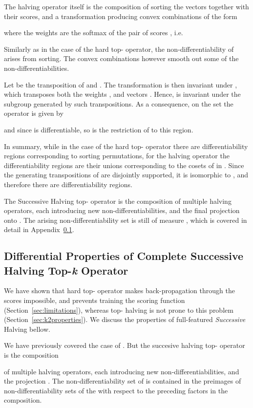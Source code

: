 \documentclass{article}
\begin{document}
The halving operator itself is the composition of sorting the vectors together with their scores, and a transformation  producing  convex combinations of the form 

where the weights are the softmax of the pair of scores , i.e.


Similarly as in the case of the hard top- operator, the non-differentiability of  arises from sorting. The convex combinations however smooth out some of the non-differentiabilities.

Let  be the transposition of  and . The transformation  is then invariant under , which transposes both the weights , and vectors . Hence,  is invariant under the subgroup  generated by such transpositions. As a consequence, on the set  the operator  is given by

and since  is differentiable, so is the restriction of  to this region.

In summary, while in the case of the hard top- operator there are  differentiability regions corresponding to sorting permutations, for the halving operator the differentiability regions are their unions corresponding to the cosets of  in . Since the generating transpositions of  are disjointly supported, it is isomorphic to , and therefore there are  differentiability regions.

The Successive Halving top- operator is the composition of multiple halving operators, each introducing new non-differentiabilities, and the final projection onto . The arising non-differentiability set is still of measure , which is covered in detail in Appendix~\ref{appendix_math}.


\subsection{Differential Properties of Complete Successive Halving Top-\textit{k} Operator}\label{appendix_math}

We have shown that hard top- operator makes back-propagation through the scores impossible, and prevents training the scoring function (Section~\ref{sec:limitations}), whereas top- halving is not prone to this problem (Section~\ref{sec:k2properties}). We discuss the properties of full-featured \emph{Successive} Halving bellow.

We have previously covered the case of . But the succesive halving top- operator  is the composition 

of multiple halving operators, each introducing new non-differentiabilities, and the projection . The non-differentiability set of  is contained in the preimages of non-differentiability sets of the  with respect to the preceding factors in the composition.
\end{document}
